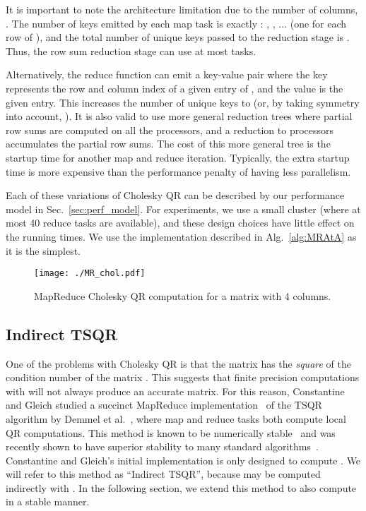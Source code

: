 \documentclass[10pt, conference, compsocconf]{IEEEtran}
\begin{document}
It is important to note the architecture limitation due to the number of columns, .  The number of keys emitted by each map task is exactly : , , ...  (one for each row of ), and the total number of unique keys passed to the reduction stage is .  Thus, the row sum reduction stage can use at most  tasks.

Alternatively, the reduce function can emit a key-value pair where the key represents the row and column index of a given entry of , and the value is the given entry.  This increases the number of unique keys to  (or, by taking symmetry into account, ).  It is also valid to use more general reduction trees where partial row sums are computed on all the processors, and a reduction to  processors accumulates the partial row sums.  The cost of this more general tree is the startup time for another map and reduce iteration.  Typically, the extra startup time is more expensive than the performance penalty of having less parallelism.

Each of these variations of Cholesky QR can be described by our performance model in Sec.~\ref{sec:perf_model}.  For experiments, we use a small cluster (where at most 40 reduce tasks are available), and these design choices have little effect on the running times.  We use the implementation described in Alg.~\ref{alg:MRAtA} as it is the simplest.


\begin{figure*}
\centering
\texttt{[image: ./MR\_chol.pdf]}
\caption{MapReduce Cholesky QR computation for a matrix  with 4 columns.}
\label{fig:MR_chol}
\end{figure*}



\subsection{Indirect TSQR}\label{sec:indir_tsqr}

One of the problems with Cholesky QR is that the matrix  has the \emph{square} of the condition number of the matrix . This suggests that finite precision computations with  will not always produce an accurate  matrix. For this reason, Constantine and Gleich studied a succinct MapReduce implementation~\cite{Constantine-2011-TSQR-MapReduce} of the TSQR algorithm by Demmel et al.~\cite{demmel-2008-caqr}, where map and reduce tasks both compute local QR computations.  This method is known to be numerically stable~\cite{demmel-2008-caqr} and was recently shown to have superior stability to many standard algorithms~\cite{Mori-2012-allreduce}.  Constantine and Gleich's initial implementation is only designed to compute .  We will refer to this method as ``Indirect TSQR'', because  may be computed indirectly with .  In the following section, we extend this method to also compute  in a stable manner. 
\end{document}
